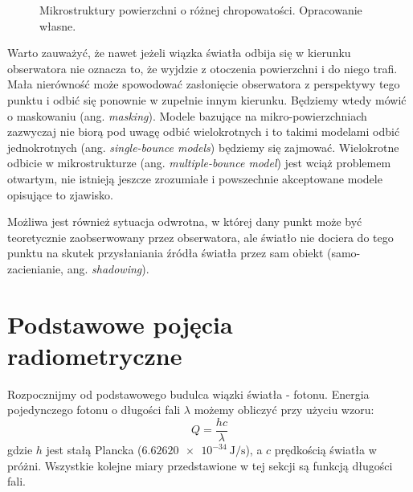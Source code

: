 \documentclass[../main.tex]{subfiles}
\begin{document}
\begin{figure}[ht]
  \centering
  \hspace{0.5cm}
  \vspace{0.25cm}
  \caption{Mikrostruktury powierzchni o różnej chropowatości. Opracowanie własne.}
	\label{fig:Microstructure}
\end{figure}

Warto zauważyć, że nawet jeżeli wiązka światła odbija się w kierunku obserwatora nie oznacza to, że wyjdzie z otoczenia powierzchni i do niego trafi. Mała nierówność może spowodować zasłonięcie obserwatora z perspektywy tego punktu i odbić się ponownie w zupełnie innym kierunku. Będziemy wtedy mówić o maskowaniu (ang. \textit{masking}). Modele bazujące na mikro-powierzchniach zazwyczaj nie biorą pod uwagę odbić wielokrotnych i to takimi modelami odbić jednokrotnych (ang. \textit{single-bounce models}) będziemy się zajmować. Wielokrotne odbicie w mikrostrukturze (ang. \textit{multiple-bounce model}) jest wciąż problemem otwartym, nie istnieją jeszcze zrozumiałe i powszechnie akceptowane modele opisujące to zjawisko.

Możliwa jest również sytuacja odwrotna, w której dany punkt może być teoretycznie zaobserwowany przez obserwatora, ale światło nie dociera do tego punktu na skutek przysłaniania źródła światła przez sam obiekt (samo-zacienianie, ang. \textit{shadowing}).


\section{Podstawowe pojęcia radiometryczne}

Rozpocznijmy od podstawowego budulca wiązki światła - fotonu. Energia pojedynczego fotonu o długości fali $\lambda$ możemy obliczyć przy użyciu wzoru:
\[ 
    Q = \frac{hc}{\lambda} 
\]
\noindent gdzie $h$ jest stałą Plancka ($\SI{6.62620e-34}{\joule\per\second}$), a $c$ prędkością światła w próżni. Wszystkie kolejne miary przedstawione w tej sekcji są funkcją długości fali.
\end{document}
